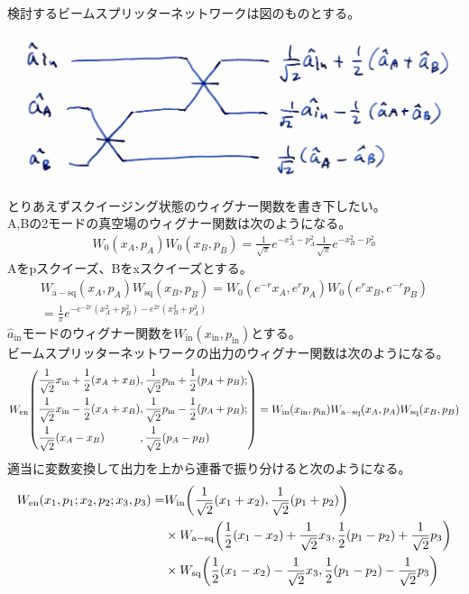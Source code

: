 \documentclass{jsarticle}
\newcommand{\mr}[1]{\mathrm{#1}}
\begin{document}
検討するビームスプリッターネットワークは図のものとする。\\
\includegraphics[width=1\linewidth]{./graphics/BSnet.pdf}
とりあえずスクイージング状態のウィグナー関数を書き下したい。\\
A,Bの2モードの真空場のウィグナー関数は次のようになる。
\begin{gather*}
	W_0(x_A,p_A)W_0(x_B,p_B)
	=
	\frac{1}{\sqrt{\pi}}
	e^{-x_A^2-p_A^2}
	\frac{1}{\sqrt{\pi}}
	e^{-x_B^2-p_B^2}
\end{gather*}
Aをpスクイーズ、Bをxスクイーズとする。
\begin{gather*}
	W_\mr{a-sq}(x_A,p_A)
	W_\mr{sq}(x_B,p_B)
	=
	W_0(e^{-r} x_A,e^r p_A)W_0(e^r x_B,e^{-r} p_B)\\
	= \frac{1}{\pi} e^{ -e^{-2r}(x_A^2 + p_B^2) - e^{2r}(x_B^2 + p_A^2)}
\end{gather*}
$\hat{a}_\mr{in}$モードのウィグナー関数を$W_\mr{in}(x_\mr{in},p_\mr{in})$とする。\\
ビームスプリッターネットワークの出力のウィグナー関数は次のようになる。
\begin{gather*}
	W_\mr{en} \qty(
		\begin{alignedat}{2}
			&\frac{1}{\sqrt{2}} x_\mr{in} + \frac{1}{2}(x_A+x_B)&	&,\frac{1}{\sqrt{2}} p_\mr{in} + \frac{1}{2}(p_A+p_B);\\
			&\frac{1}{\sqrt{2}} x_\mr{in} - \frac{1}{2}(x_A+x_B)&	&,\frac{1}{\sqrt{2}} p_\mr{in} - \frac{1}{2}(p_A+p_B);\\
			&\frac{1}{\sqrt{2}} (x_A - x_B)						&	&,\frac{1}{\sqrt{2}} (p_A - p_B)
		\end{alignedat}
	)
	=
	W_\mr{in}(x_\mr{in},p_\mr{in})
	W_\mr{a-sq}(x_A,p_A)
	W_\mr{sq}(x_B,p_B)
\end{gather*}
適当に変数変換して出力を上から連番で振り分けると次のようになる。
\begin{align*}
	W_\mr{en}(x_1,p_1;x_2,p_2;x_3,p_3)
	=&
	W_\mr{in} \qty( \frac{1}{\sqrt{2}} (x_1+x_2), \frac{1}{\sqrt{2}} (p_1+p_2) )\\
	& \times W_\mr{a-sq} \qty( \frac{1}{2} (x_1-x_2) + \frac{1}{\sqrt{2}} x_3, \frac{1}{2} (p_1-p_2) + \frac{1}{\sqrt{2}} p_3)\\
	& \times W_\mr{sq} \qty( \frac{1}{2} (x_1-x_2) - \frac{1}{\sqrt{2}} x_3, \frac{1}{2} (p_1-p_2) - \frac{1}{\sqrt{2}} p_3 )
\end{align*}
\end{document}

